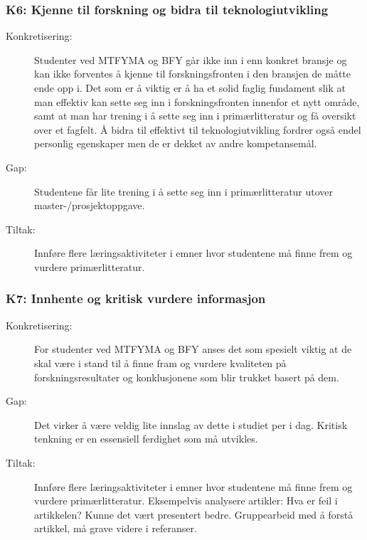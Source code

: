 \subsubsection{K6: Kjenne til forskning og bidra til teknologiutvikling}
\begin{description}
\item[Konkretisering:] Studenter ved MTFYMA og BFY går ikke inn i enn konkret bransje og kan ikke forventes å kjenne til forskningsfronten i den bransjen de måtte ende opp i. Det som er å viktig er å ha et solid faglig fundament slik at man effektiv kan sette seg inn i forskningsfronten innenfor et nytt område, samt at man har trening i å sette seg inn i primærlitteratur og få oversikt over et fagfelt. Å bidra til effektivt til teknologiutvikling fordrer også endel personlig egenskaper men de er dekket av andre kompetansemål.
\item[Gap:] Studentene får lite trening i å sette seg inn i primærlitteratur utover master-/prosjektoppgave.
\item[Tiltak:] Innføre flere læringsaktiviteter i emner hvor studentene må finne frem og vurdere primærlitteratur. 
\end{description}

\subsubsection{K7: Innhente og kritisk vurdere informasjon}
\begin{description}
\item[Konkretisering:] For studenter ved MTFYMA og BFY anses det som spesielt viktig at de skal være i stand til å finne fram og vurdere kvaliteten på forskningsresultater og konklusjonene som blir trukket basert på dem. 
\item[Gap:] Det virker å være veldig lite innslag av dette i studiet per i dag. Kritisk tenkning er en essensiell ferdighet som må utvikles.
\item[Tiltak:] Innføre flere læringsaktiviteter i emner hvor studentene må finne frem og vurdere primærlitteratur. Eksempelvis analysere artikler: Hva er feil i artikkelen? Kunne det vært presentert bedre. Gruppearbeid med å forstå artikkel, må grave videre i referanser.
\end{description}


